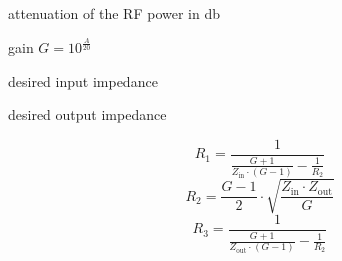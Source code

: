 \documentclass[varwidth,convert={density=300,size=800x800,outext=.png}]{standalone}
\newcommand{\Zin}{Z_\mathrm{in}}
\newcommand{\Zout}{Z_\mathrm{out}}
\begin{document}
\begin{description}[labelindent=10pt,labelsep=10pt]
\item[$A$] attenuation of the RF power in \si{\decibel}
\item[$G$] gain $G = 10^{\frac{A}{20}}$ 
\item[$\Zin$] desired input impedance
\item[$\Zout$] desired output impedance
\end{description}

\[R_1 = \frac{1}{\frac{G+1}{\Zin \cdot (G-1)} - \frac{1}{R_2}}\]
\[R_2 = \frac{G-1}{2}  \cdot \sqrt{\frac{\Zin \cdot \Zout}{G}}\]
\[R_3 = \frac{1}{\frac{G+1}{\Zout \cdot (G-1)} - \frac{1}{R_2}}\]
\end{document}
